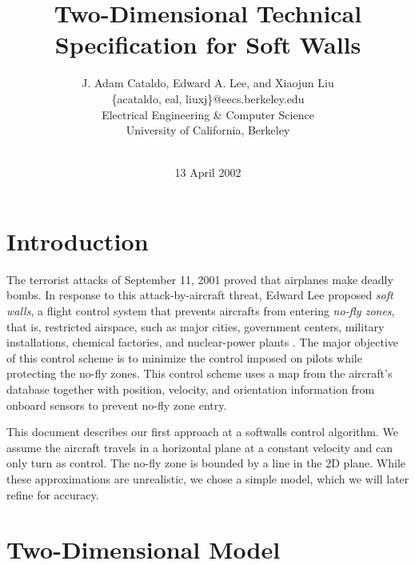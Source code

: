 \documentclass[11pt]{article}
\begin{document}


\title{Two-Dimensional Technical Specification for Soft Walls}
\author{J. Adam Cataldo, Edward A. Lee, and
Xiaojun Liu\\ \{acataldo, eal, liuxj\}@eecs.berkeley.edu\\ Electrical
Engineering \& Computer Science\\ University of California, Berkeley\\
\\} 
\date{13 April 2002}

\maketitle


\section{Introduction}

The terrorist attacks of September 11, 2001 proved that airplanes make
deadly bombs.  In response to this attack-by-aircraft threat, Edward
Lee proposed \textit{soft walls}, a flight control system that
prevents aircrafts from entering \textit{no-fly zones}, that is,
restricted airspace, such as major cities, government centers,
military installations, chemical factories, and nuclear-power plants
\cite{Lee}.  The major objective of this control scheme is to minimize
the control imposed on pilots while protecting the no-fly zones.  This
control scheme uses a map from the aircraft's database together with
position, velocity, and orientation information from onboard sensors
to prevent no-fly zone entry.

This document describes our first approach at a softwalls control
algorithm.  We assume the aircraft travels in a horizontal plane at a
constant velocity and can only turn as control.  The no-fly zone is
bounded by a line in the 2D plane.  While these approximations are
unrealistic, we chose a simple model, which we will later refine for
accuracy.



\section{Two-Dimensional Model}
\end{document}
